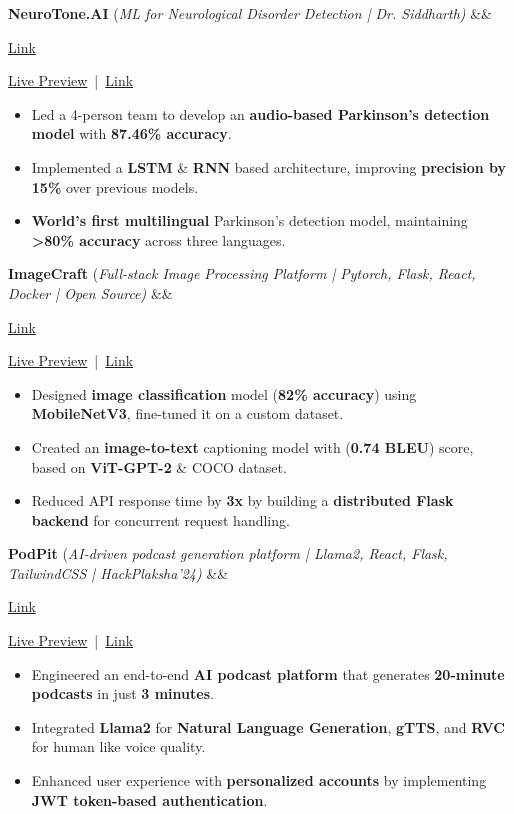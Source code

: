 \documentclass[letterpaper, 10.5t]{article}
\newcommand{\bulletSep} { \vspace{1.5mm} }
\newcommand{\linkFont}[1]{
    {\fontfamily{lmtt}\selectfont#1}
}
\newcommand{\link}[2]{
    {\fontfamily{lmtt}\selectfont\href{#1}{#2}}
}
\newcommand{\projectItem}[5]{
    {\textbf{#1}} {(\sl #2)}\hfill
    \ifx&#3&%
    \link{#4}{Link}\\
    \else
    \linkFont{\href{#3}{Live Preview}~|~\href{#4}{Link}}\\
    \fi
    \vspace{2pt}
    \begin{itemize}
        #5
    \end{itemize}
}
\begin{document}
\projectItem{NeuroTone.AI}{ML for Neurological Disorder Detection | Dr. Siddharth} {}{https://ai3011.plaksha.edu.in/spring2024.html\#parkinson}{

    \item Led a 4-person team to develop an \textbf{audio-based Parkinson's detection model} with \textbf{87.46\% accuracy}.     
    \vspace{0.7mm}


    \item Implemented a \textbf{LSTM} \& \textbf{RNN} based architecture, improving \textbf{precision by 15\%} over previous models.     \vspace{0.7mm}

    \item \textbf{World's first multilingual} Parkinson's detection model, maintaining \textbf{>80\% accuracy} across three languages.
}

\bulletSep

\projectItem{ImageCraft}{Full-stack Image Processing Platform | Pytorch, Flask, React, Docker | Open Source}{}{https://github.com/pratikranaa/imagecraft}{   


    \item Designed \textbf{image classification} model (\textbf{82\% accuracy}) using \textbf{MobileNetV3}, fine-tuned it on a custom dataset.     \vspace{0.7mm}

    \item Created an \textbf{image-to-text} captioning model with (\textbf{0.74 BLEU}) score, based on \textbf{ViT-GPT-2} \& COCO dataset.     \vspace{0.7mm}

    \item Reduced API response time by \textbf{3x} by building a \textbf{distributed Flask backend} for concurrent request handling.     

}
\bulletSep


\projectItem{PodPit}{AI-driven podcast generation platform | Llama2, React, Flask, TailwindCSS | HackPlaksha’24}{}{https://devfolio.co/projects/podnews-1159}{


    \item Engineered an end-to-end \textbf{AI podcast  platform} that generates \textbf{20-minute podcasts} in just \textbf{3 minutes}.     \vspace{0.7mm}

    \item Integrated \textbf{Llama2} for \textbf{Natural Language Generation}, \textbf{gTTS}, and \textbf{RVC} for human like voice quality.    \vspace{0.7mm}

    \item Enhanced user experience with \textbf{personalized accounts} by implementing \textbf{JWT token-based authentication}.
}
\end{document}
